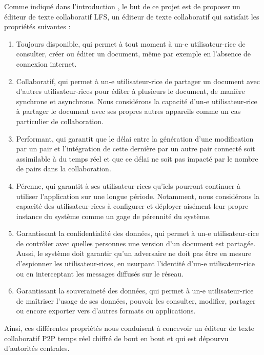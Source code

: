 Comme indiqué dans l'introduction , le but de ce projet est de proposer un éditeur de texte collaboratif \acf{LFS}, \ie un éditeur de texte collaboratif qui satisfait les propriétés suivantes :
\begin{enumerate}
    \item Toujours disponible, \ie qui permet à tout moment à un-e utilisateur-rice de consulter, créer ou éditer un document, même par exemple en l'absence de connexion internet.
    \item Collaboratif, \ie qui permet à un-e utilisateur-rice de partager un document avec d'autres utilisateur-rices pour éditer à plusieurs le document, de manière synchrone et asynchrone.
        Nous considérons la capacité d'un-e utilisateur-rice à partager le document avec ses propres autres appareils comme un cas particulier de collaboration.
    \item Performant, \ie qui garantit que le délai entre la génération d'une modification par un pair et l'intégration de cette dernière par un autre pair connecté soit assimilable à du temps réel et que ce délai ne soit pas impacté par le nombre de pairs dans la collaboration.
    \item Pérenne, \ie qui garantit à ses utilisateur-rices qu'iels pourront continuer à utiliser l'application sur une longue période.
        Notamment, nous considérons la capacité des utilisateur-rices à configurer et déployer aisément leur propre instance du système comme un gage de pérennité du système.
    \item Garantissant la confidentialité des données, \ie qui permet à un-e utilisateur-rice de contrôler avec quelles personnes une version d'un document est partagée.
        Aussi, le système doit garantir qu'un adversaire ne doit pas être en mesure d'espionner les utilisateur-rices, \eg en usurpant l'identité d'un-e utilisateur-rice ou en interceptant les messages diffusés sur le réseau.
    \item Garantissant la souveraineté des données, \ie qui permet à un-e utilisateur-rice de maîtriser l'usage de ses données, \eg pouvoir les consulter, modifier, partager ou encore exporter vers d'autres formats ou applications.
\end{enumerate}

Ainsi, ces différentes propriétés nous conduisent à concevoir un éditeur de texte collaboratif \ac{P2P} temps réel chiffré de bout en bout et qui est dépourvu d'autorités centrales.
